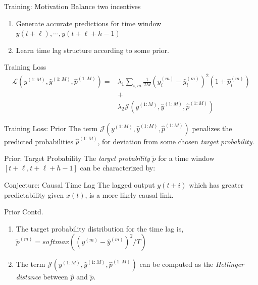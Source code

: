 \documentclass{beamer}
\begin{document}
\begin{frame}{Training: Motivation}
Balance two incentives

\begin{enumerate}
    \item Generate accurate predictions for time window $y(t+\ell), \cdots, y(t+\ell+h-1)$
    \newline
    \item Learn time lag structure according to some prior.
\end{enumerate}
\end{frame}

\begin{frame}{Training Loss}
\begin{align*}
\mathcal{L}(y^{(1:M)}, \hat{y}^{(1:M)}, \hat{p}^{(1:M)}) = &\lambda_1 \sum_{i,m}{\frac{1}{2M} (y^{(m)}_{i} - \hat{y}^{(m)}_{i})^2 (1 + \hat{p}^{(m)}_i)} \\ &+ \\ &\lambda_2 \mathcal{J}(y^{(1:M)}, \hat{y}^{(1:M)}, \hat{p}^{(1:M)})
\end{align*}
\end{frame}

\begin{frame}{Training Loss: Prior}
The term $\mathcal{J}(y^{(1:M)}, \hat{y}^{(1:M)}, \hat{p}^{(1:M)})$ penalizes the predicted probabilities $\hat{p}^{(1:M)}$, for deviation from some chosen \textit{target probability}.
    
\end{frame}

\begin{frame}{Prior: Target Probability}
The \textit{target probability} $\widetilde{p}$ for a time window $[t+\ell, t+\ell+h-1]$ can be characterized by:
\newline

\begin{block}{Conjecture: Causal Time Lag}
The lagged output $y(t+i)$ which has greater predictability given $x(t)$, is a more likely causal link. 
\end{block}

    
\end{frame}


\begin{frame}{Prior Contd.}

\begin{enumerate}
\item The target probability distribution for the time lag is, $\widetilde{p}^{(m)} = softmax( (y^{(m)} - \hat{y}^{(m)})^{2}/T )$
\newline
\item The term $\mathcal{J}(y^{(1:M)}, \hat{y}^{(1:M)}, \hat{p}^{(1:M)})$ can be computed as the \emph{Hellinger distance} between $\hat{p}$ and $\widetilde{p}$.
\end{enumerate}
\end{frame}
\end{document}
